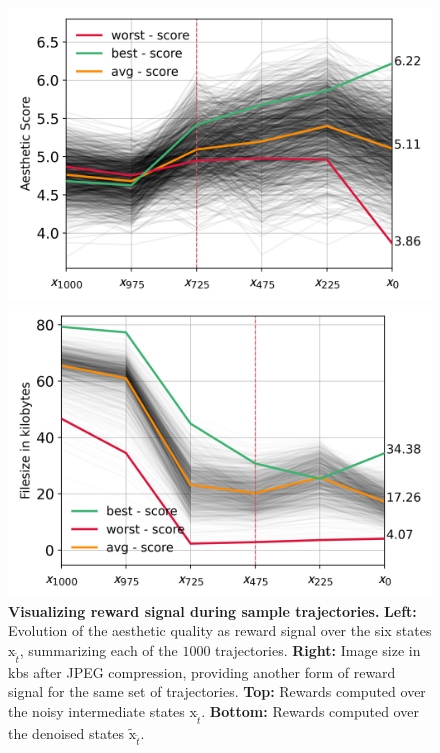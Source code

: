 \begin{figure}[ht]
\begin{minipage}{0.5\textwidth}
  \end{minipage}\vspace{-0.1cm} %
  \begin{minipage}{0.5\textwidth}
      \centering
      \includegraphics[width=1\textwidth]{img/results/1k-denoise-trajectories-aestheic-score-single.png} %
  \end{minipage}\hfill
  \begin{minipage}{0.5\textwidth}
      \centering
      \includegraphics[width=1\textwidth]{img/results/1k-denoise-trajectories-jpeg-size-single.png} %
  \end{minipage}
  \vspace{-8pt}  %
    \captionsetup{width=\textwidth} %
    \caption{\textbf{Visualizing reward signal during sample trajectories.} \textbf{Left:} Evolution of the aesthetic quality as reward signal over the six states $\mathrm{x}_{\tilde{t}}$, summarizing each of the $1000$ trajectories. \textbf{Right:} Image size in kbs after JPEG compression, providing another form of reward signal for the same set of trajectories. \textbf{Top:} Rewards computed over the noisy intermediate states $\mathrm{x}_{\tilde{t}}$. \textbf{Bottom:} Rewards computed over the denoised states $\tilde{\mathrm{x}}_{\tilde{t}}$.}
  \label{fig:samples-trajectory-rewards} %
\end{figure}

